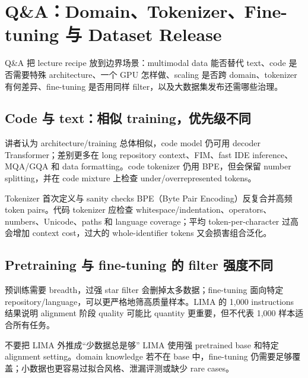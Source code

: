 \section{Q\&A：Domain、Tokenizer、Fine-tuning 与 Dataset Release}

Q\&A 把 lecture recipe 放到边界场景：multimodal data 能否替代 text、code 是否需要特殊 architecture、一个 GPU 怎样做、scaling 是否跨 domain、tokenizer 有何差异、fine-tuning 是否用同样 filter，以及大数据集发布还需哪些治理。

\subsection{Code 与 text：相似 training，优先级不同}

讲者认为 architecture/training 总体相似，code model 仍可用 decoder Transformer；差别更多在 long repository context、FIM、fast IDE inference、MQA/GQA 和 data formatting。code tokenizer 仍用 BPE，但会保留 number splitting，并在 code mixture 上检查 under/overrepresented tokens。

\begin{knowledgebox}{Tokenizer 首次定义与 sanity checks}
BPE（Byte Pair Encoding）反复合并高频 token pairs。代码 tokenizer 应检查 whitespace/indentation、operators、numbers、Unicode、paths 和 language coverage；平均 token-per-character 过高会增加 context cost，过大的 whole-identifier tokens 又会损害组合泛化。
\end{knowledgebox}


\subsection{Pretraining 与 fine-tuning 的 filter 强度不同}

预训练需要 breadth，过强 star filter 会删掉太多数据；fine-tuning 面向特定 repository/language，可以更严格地筛高质量样本。LIMA 的 1,000 instructions 结果说明 alignment 阶段 quality 可能比 quantity 更重要，但不代表 1,000 样本适合所有任务。

\begin{warningbox}{不要把 LIMA 外推成“少数据总是够”}
LIMA 使用强 pretrained base 和特定 alignment setting。domain knowledge 若不在 base 中，fine-tuning 仍需要足够覆盖；小数据也更容易过拟合风格、泄漏评测或缺少 rare cases。
\end{warningbox}


